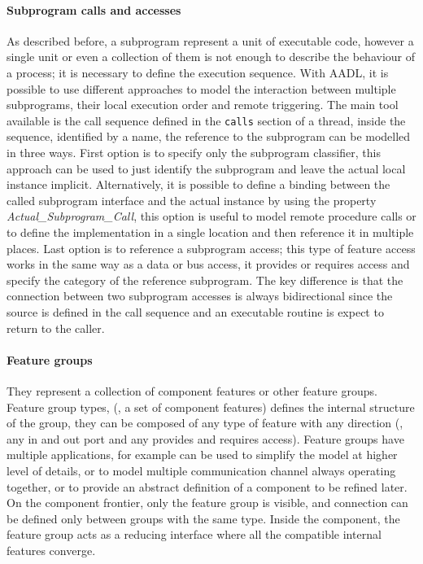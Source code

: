 \paragraph{Subprogram calls and accesses}
As described before, a subprogram represent a unit of executable code, however a single unit or even a collection of them is not enough to describe the behaviour of a process; it is necessary to define the execution sequence. With AADL, it is possible to use different approaches to model the interaction between multiple subprograms, their local execution order and remote triggering. The main tool available is the call sequence defined in the \texttt{calls} section of a thread, inside the sequence, identified by a name, the reference to the subprogram can be modelled in three ways. First option is to specify only the subprogram classifier, this approach can be used to just identify the subprogram and leave the actual local instance implicit. Alternatively, it is possible to define a binding between the called subprogram interface and the actual instance by using the property \textit{Actual\_Subprogram\_Call}, this option is useful to model remote procedure calls or to define the implementation in a single location and then reference it in multiple places. Last option is to reference a subprogram access; this type of feature access works in the same way as a data or bus access, it provides or requires access and specify the category of the reference subprogram. The key difference is that the connection between two subprogram accesses is always bidirectional since the source is defined in the call sequence and an executable routine is expect to return to the caller.

\paragraph{Feature groups}
They represent a collection of component features or other feature groups. Feature group types, (\ie, a set of component features) defines the internal structure of the group, they can be composed of any type of feature with any direction (\ie, any in and out port and any provides and requires access). Feature groups have multiple applications, for example can be used to simplify the model at higher level of details, or to model multiple communication channel always operating together, or to provide an abstract definition of a component to be refined later. On the component frontier, only the feature group is visible, and connection can be defined only between groups with the same type. Inside the component, the feature group acts as a reducing interface where all the compatible internal features converge.

